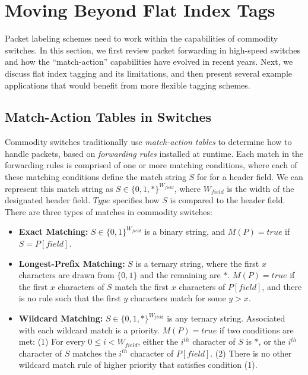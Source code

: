 \section{Moving Beyond Flat Index Tags} \label{sec:background}
Packet labeling schemes need to work within the capabilities of commodity
switches. In this section, we first review packet forwarding in high-speed
switches and how the ``match-action'' capabilities have evolved in recent years.
Next, we discuss flat index tagging and its limitations, and then present
several example applications that would benefit from more flexible tagging
schemes.

\subsection{Match-Action Tables in Switches} Commodity switches traditionally
use \emph{match-action tables} to determine how to handle packets, based on
\textit{forwarding rules} installed at runtime. Each match in the forwarding
rules is comprised of one or more matching conditions, where each of these 
matching conditions define the match string $S$ for for a header field. 
We can represent this match string as $S \in \{0,1,*\}^{W_{field}}$, where
$W_{field}$ is the width of the designated header field. $Type$ specifies how
$S$ is compared to the header field. There are three types of matches in
commodity switches:

\begin{itemize} \item \textbf{Exact Matching:} $S \in \{0,1\}^{W_{field}}$ is a
binary string, and $M(P) = true$ if $S = P[field]$.\\ \item
\textbf{Longest-Prefix Matching:} $S$ is a ternary string, where the first $x$
characters are drawn from $\{0,1\}$ and the remaining are $*$. $M(P) = true$ if
the first $x$ characters of $S$ match the first $x$ characters of $P[field]$,
and there is no rule such that the first $y$ characters match for some $y >
x$.\\ \item \textbf{Wildcard Matching:} $S \in \{0,1,*\}^{W_{field}}$ is any
ternary string. Associated with each wildcard match is a priority. $M(P) = true$
if two conditions are met: (1) For every $0 \le i < W_{field}$, either the
$i^{th}$ character of $S$ is $*$, or the $i^{th}$ character of $S$ matches
the $i^{th}$ character of $P[field]$. (2) There is no other wildcard match
rule of higher priority that satisfies condition (1).  \end{itemize}
  
